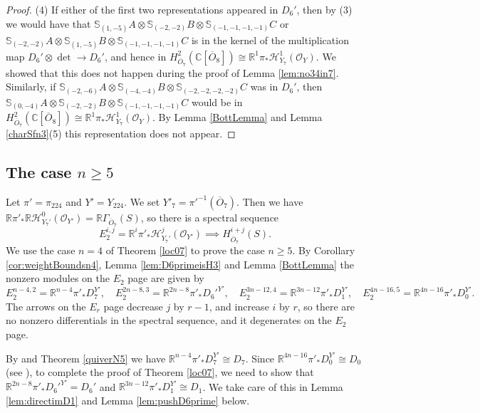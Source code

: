 \documentclass[11pt,reqno]{amsart}
\newcommand{\oo}{\otimes}
\newcommand{\bS}{\mathbb{S}}
\newcommand{\C}{\mathbb{C}}
\renewcommand{\det}{\operatorname{det}}
\newcommand{\mc}[1]{\mathcal{#1}}
\newcommand{\ol}[1]{\overline{#1}}
\numberwithin{equation}{section}
\begin{document}
\begin{proof}
(4) If either of the first two representations appeared in $D_6'$, then by (3) we would have that $\bS_{(1,-5)}A\oo \bS_{(-2,-2)}B\oo \bS_{(-1,-1,-1,-1)}C$ or $\bS_{(-2,-2)}A\oo \bS_{(1,-5)}B\oo \bS_{(-1,-1,-1,-1)}C$ is in the kernel of the multiplication map $D_6'\oo \det \to D_6'$, and hence in  $H^2_{\ol{O}_7}(\C[\ol{O}_8])\cong \mathbb{R}^1\pi_{\ast}\mathscr{H}^1_{Y_7}(\mc{O}_Y)$. We showed that this does not happen during the proof of Lemma \ref{lem:no34in7}. Similarly, if  $\bS_{(-2,-6)}A\oo \bS_{(-4,-4)}B\oo \bS_{(-2,-2,-2,-2)}C$ was in $D_6'$, then $\bS_{(0,-4)}A\oo \bS_{(-2,-2)}B\oo \bS_{(-1,-1,-1,-1)}C$ would be in $H^2_{\ol{O}_7}(\C[\ol{O}_8])\cong \mathbb{R}^1\pi_{\ast}\mathscr{H}^1_{Y_7}(\mc{O}_Y)$. By Lemma \ref{BottLemma} and Lemma \ref{charSfn3}(5) this representation does not appear.
\end{proof}

\subsection{The case $n\geq 5$}\label{sec:lcO7ngeq5} Let $\pi'=\pi_{224}$ and $Y'=Y_{224}$. We set $Y'_7=\pi'^{-1}(\ol{O}_7)$. Then we have $\mathbb{R}\pi'_{\ast}\mathbb{R}\mathscr{H}^0_{Y_7'}(\mc{O}_{Y'})=\mathbb{R}\Gamma_{\ol{O}_7}(S)$, so there is a spectral sequence
\begin{equation}\label{localO7ngeq5}
E_2^{i,j}=\mathbb{R}^i\pi'_{\ast}\mathscr{H}^j_{Y_7'}(\mc{O}_{Y'})\implies H^{i+j}_{\ol{O}_7}(S).
\end{equation} 
We use the case $n=4$ of Theorem \ref{loc07} to prove the case $n\geq 5$. By Corollary \ref{cor:weightBoundsn4}, Lemma \ref{lem:D6primeisH3} and Lemma \ref{BottLemma} the nonzero modules on the $E_2$ page are given by
$$
E_2^{n-4,2}=\mathbb{R}^{n-4}\pi'_{\ast}D_7^{Y'} ,\quad E_2^{2n-8,3}=\mathbb{R}^{2n-8}\pi'_{\ast}D_6'^{Y'},\quad E_2^{3n-12,4}=\mathbb{R}^{3n-12}\pi'_{\ast}D_1^{Y'},\quad E_2^{4n-16,5}=\mathbb{R}^{4n-16}\pi'_{\ast}D_0^{Y'}.
$$
The arrows on the $E_r$ page decrease $j$ by $r-1$, and increase $i$ by $r$, so there are no nonzero differentials in the spectral sequence, and it degenerates on the $E_2$ page.

By \cite[Lemma 3.11]{lHorincz2019categories} and Theorem \ref{quiverN5} we have $\mathbb{R}^{n-4}\pi'_{\ast}D_7^{Y'}\cong D_7$. Since $\mathbb{R}^{4n-16}\pi'_{\ast}D_0^{Y'}\cong D_0$ (see \cite[Lemma 3.4]{socledegs}), to complete the proof of Theorem \ref{loc07}, we need to show that $\mathbb{R}^{2n-8}\pi'_{\ast}D_6'^{Y'}=D_6'$ and $\mathbb{R}^{3n-12}\pi'_{\ast}D_1^{Y'}\cong D_1$. We take care of this in Lemma \ref{lem:directimD1} and Lemma \ref{lem:pushD6prime} below.
\end{document}
